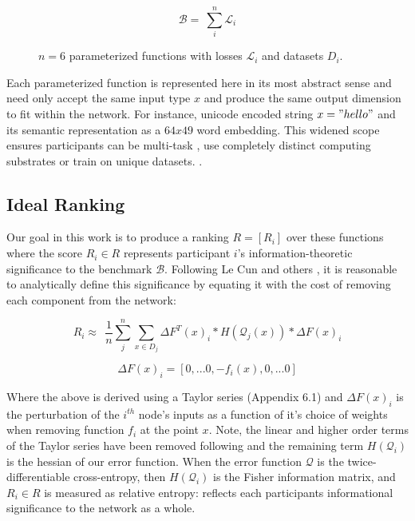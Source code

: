 \documentclass{article}
\begin{document}
\begin{equation}
\mathcal{B} = \ \sum_{i}^{n} \mathcal{L}_i 
\end{equation}

\begin{figure}[H]
	\centering
	\hspace*{-2cm}
	
	\caption{$n=6$ parameterized functions with losses $\mathcal{L}_i$ and datasets $D_i$.}
\end{figure}{}

Each parameterized function is represented here in its most abstract sense\cite{hinton2015distilling} and need only accept the same input type $x$ and produce the same output dimension to fit within the network. {\color{blue} For instance, unicode encoded string $x = "hello"$ and its semantic representation as a $64x49$ word embedding.} This widened scope ensures participants can be multi-task \cite{kaiser2017model}, use completely distinct computing substrates \cite{alex2014cortical} or train on unique datasets. \cite{lample2019crosslingual}. 

\subsection{Ideal Ranking}

Our goal in this work is to produce a ranking $R = [R_i]$ over these functions where the score $R_i \in R$ represents participant $i$'s information-theoretic significance to the benchmark $\mathcal{B}$. Following Le Cun and others \cite{lecun1989optimalbraindamage,yu2017nisp}, it is reasonable to analytically define this significance by equating it with the cost of removing each component from the network:

\begin{equation}
\label{eq:r}
R_i \approx \ \ \frac{1}{n} \sum_{j}^{n} \sum_{x \in D_j} \Delta F^T(x)_i * H(\mathcal{Q}_j(x)) * \Delta F(x)_i 
\end{equation}

\[ \Delta F (x)_i = [0, ... 0, -f_i(x), 0, ... 0] \]

Where the above is derived using a Taylor series (Appendix 6.1) and $\Delta F (x)_i$ is the {\color{blue} perturbation of the $i^{th}$ node's inputs as a function of it's choice of weights when removing function $f_i$ at the point $x$}. Note, the linear and higher order terms of the Taylor series have been removed following \cite{yu2017nisp} and the remaining term $H(\mathcal{Q}_i)$ is the hessian of our error function. When the error function $\mathcal{Q}$ is the twice-differentiable cross-entropy, then $H(\mathcal{Q}_i)$ is the Fisher information matrix, and $R_i \in R$ is measured as relative entropy: reflects each participants informational significance to the network as a whole.
\end{document}
